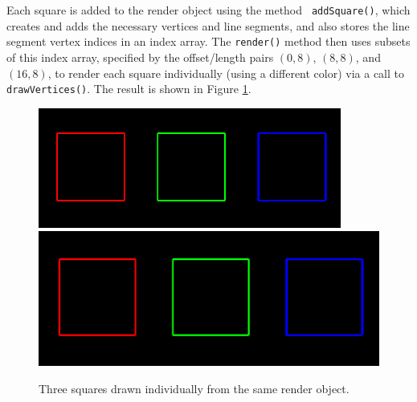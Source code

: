 %
Each square is added to the render object using the method {\tt
addSquare()}, which creates and adds the necessary vertices and line
segments, and also stores the line segment vertex indices in an index
array. The {\tt render()} method then uses subsets of this index
array, specified by the offset/length pairs $(0, 8)$, $(8, 8)$, and
$(16, 8)$, to render each square individually (using a different
color) via a call to {\tt drawVertices()}.  The result is shown in
Figure \ref{threeSquares:fig}.

\begin{figure}[h]
\begin{center}
\iflatexml
 \includegraphics[]{images/threeSquares}
\else
 \includegraphics[width=5.00in]{images/threeSquares}
\fi
\end{center}
\caption{Three squares drawn individually from the same render object.}
\label{threeSquares:fig}
\end{figure}
%

